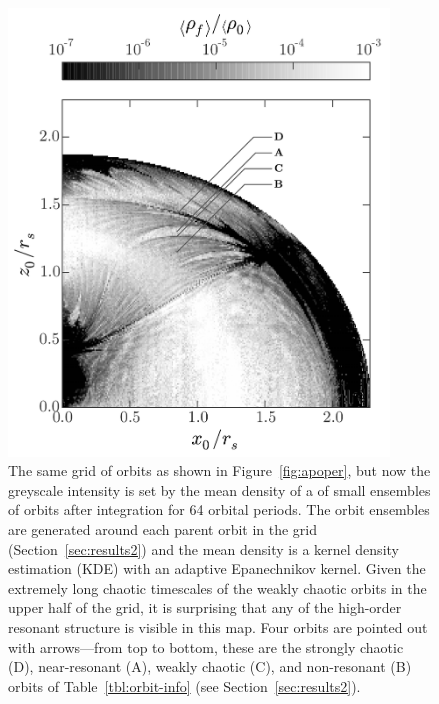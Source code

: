 \documentclass[letterpaper,12pt,preprint]{aastex}
\begin{document}
\clearpage
\begin{figure}[p]
\begin{center}
\includegraphics[width=0.9\textwidth, trim={0 0.2cm 0 0}]{figures/ensemble-map.pdf}
\caption{The same grid of orbits as shown in Figure~\ref{fig:apoper}, but now the greyscale intensity is set by the mean density of a of small ensembles of orbits after integration for 64 orbital periods. The orbit ensembles are generated around each parent orbit in the grid (Section~\ref{sec:results2}) and the mean density is a kernel density estimation (KDE) with an adaptive Epanechnikov kernel. Given the extremely long chaotic timescales of the weakly chaotic orbits in the upper half of the grid, it is surprising that any of the high-order resonant structure is visible in this map. Four orbits are pointed out with arrows---from top to bottom, these are the strongly chaotic (D), near-resonant (A), weakly chaotic (C), and non-resonant (B) orbits of Table~\ref{tbl:orbit-info} (see Section~\ref{sec:results2}).} 
\label{fig:ensemblemap-meandensity}
\end{center}
\end{figure}
\end{document}
